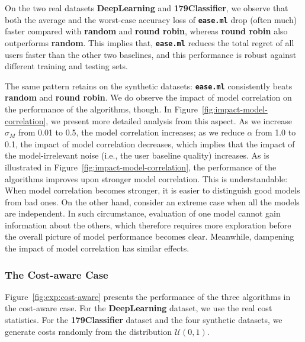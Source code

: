 \documentclass[letterpaper]{vldb}
\newcommand{\eml}{\texttt{ease.ml}\xspace}
\begin{document}
On the two real datasets {\bf DeepLearning} and {\bf 179Classifier}, we observe that both the average and the worst-case accuracy loss of {\bf \eml} drop (often much) faster compared with {\bf random} and {\bf round robin}, whereas {\bf round robin} also outperforms {\bf random}.
This implies that, {\bf \eml} reduces the total regret of all users faster than the other two baselines, and this performance is robust against different training and testing sets.


The same pattern retains on the synthetic datasets: {\bf \eml} consistently beats {\bf random} and {\bf round robin}.
We do observe the impact of model correlation on the performance of the algorithms, though.
In Figure~\ref{fig:impact-model-correlation}, we present more detailed analysis from this aspect.
As we increase $\sigma_M$ from 0.01 to 0.5, the model correlation increases; as we reduce $\alpha$ from 1.0 to 0.1, the impact of model correlation decreases, which implies that the impact of the model-irrelevant noise (i.e., the user baseline quality) increases.
As is illustrated in Figure~\ref{fig:impact-model-correlation}, the performance of the algorithms improves upon stronger model correlation.
This is understandable: When model correlation becomes stronger, it is easier to distinguish good models from bad ones.
On the other hand, consider an extreme case when all the models are independent.
In such circumstance, evaluation of one model cannot gain information about the others, which therefore requires more exploration before the overall picture of model performance becomes clear.
Meanwhile, dampening the impact of model correlation has similar effects.

\subsubsection{The Cost-aware Case}

Figure~\ref{fig:exp:cost-aware} presents the performance of the three algorithms in the cost-aware case.
For the {\bf DeepLearning} dataset, we use the real cost statistics.
For the {\bf 179Classifier} dataset and the four synthetic datasets, we generate costs randomly from the distribution $\mathcal{U}(0,1)$.
\end{document}
